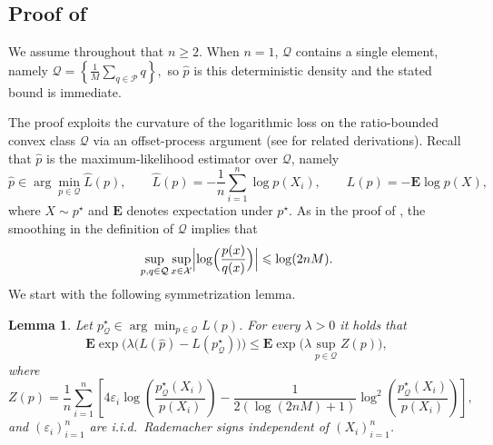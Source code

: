 \documentclass[11pt]{article}
\newcommand{\E}{{\mathbf E}}
\renewcommand{\le}{\leqslant}
\renewcommand{\ge}{\geqslant}
\newcommand{\wh}{\widehat}
\newcommand{\M}{M}
\newcommand{\X}{\mathcal{X}}
\newcommand{\Qs}{\mathcal{Q}}
\renewcommand{\triangleq}{=}
\newtheorem{lemma}{Lemma}
\theoremstyle{definition}
\theoremstyle{remark}
\begin{document}
\subsection[Proof of Proposition~\ref{prop:misspecconvexaggregation}]{Proof of }

We assume throughout that $n\ge 2$. When $n=1$, $\Qs$ contains a single element, namely
$
\Qs=\left\{\frac{1}{\M}\sum_{q\in\mathcal P}q\right\},
$
so $\widehat p$ is this deterministic density and the stated bound is immediate.

The proof exploits the curvature of the logarithmic loss on the ratio-bounded convex class $\Qs$
via an offset-process argument (see \cite{liang2015learning,mehta2017expconcave_statistical,vijaykumar2021localization} for related derivations).
Recall that $\widehat p$ is the maximum-likelihood estimator over $\Qs$, namely
\[
\widehat{p} \in \arg\min_{p \in \Qs}\wh L(p),
\qquad
\wh L(p)\triangleq -\frac{1}{n}\sum_{i=1}^n \log p(X_i),
\qquad
L(p)\triangleq -\E\log p(X),
\]
where $X\sim p^\star$ and $\E$ denotes expectation under $p^\star$.
As in the proof of , the smoothing in the definition of $\Qs$ implies that
\begin{equation}\label{eq:ratioofdens-again}
\sup_{p,q \in \Qs}\sup_{x\in\X}\Bigl|\log\Bigl(\frac{p(x)}{q(x)}\Bigr)\Bigr|
\le \log(2nM).
\end{equation}
We start with the following symmetrization lemma.

\begin{lemma} \label{lem:mgf-start-misspec}
Let $p^\star_{\Qs}\in\arg\min_{p\in\Qs} L(p)$.
For every $\lambda>0$ it holds that
\begin{equation}\label{eq:mgf-start}
\E\exp\Big(\lambda\big(L(\widehat p)-L(p^\star_{\Qs})\big)\Big)
\le \E\exp\Big(\lambda\sup_{p\in\Qs} Z(p)\Big),
\end{equation}
where
\[
Z(p)\triangleq \frac{1}{n}\sum_{i=1}^n
\left[
  4\varepsilon_i\log\left(\frac{p^\star_{\Qs}(X_i)}{p(X_i)}\right)
  -\frac{1}{2(\log(2nM)+1)}\log^2\left(\frac{p^\star_{\Qs}(X_i)}{p(X_i)}\right)
\right],
\]
and $(\varepsilon_i)_{i=1}^n$ are i.i.d.\ Rademacher signs independent of $(X_i)_{i=1}^n$.
\end{lemma}
\end{document}
